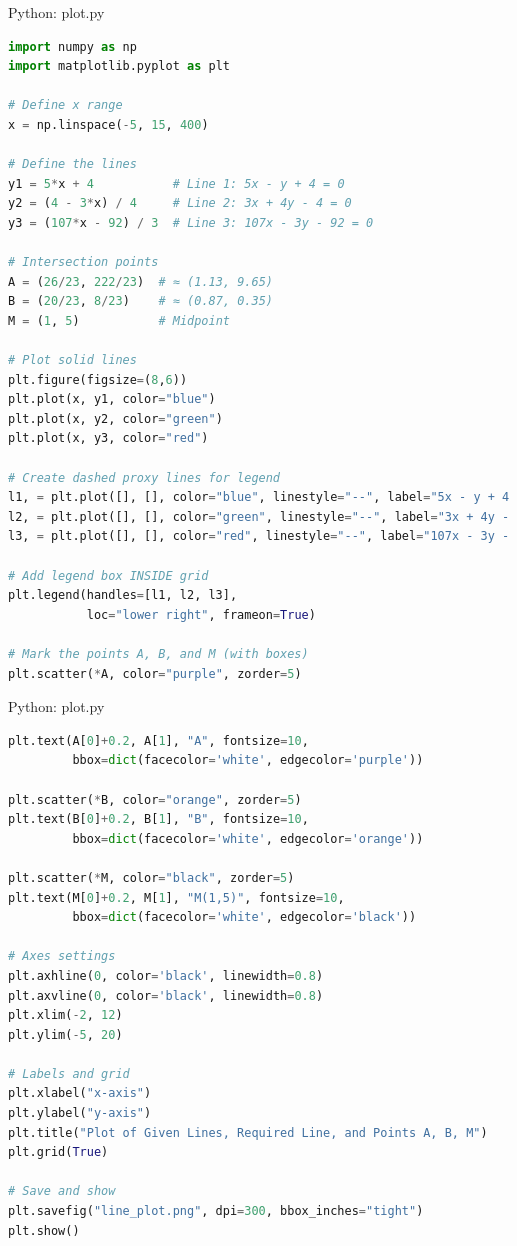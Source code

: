 \documentclass{beamer}
\numberwithin{equation}{section}
\theoremstyle{remark}
\begin{document}
\begin{frame}[fragile]{Python: plot.py}
\begin{lstlisting}[language=Python]
import numpy as np
import matplotlib.pyplot as plt

# Define x range
x = np.linspace(-5, 15, 400)

# Define the lines
y1 = 5*x + 4           # Line 1: 5x - y + 4 = 0
y2 = (4 - 3*x) / 4     # Line 2: 3x + 4y - 4 = 0
y3 = (107*x - 92) / 3  # Line 3: 107x - 3y - 92 = 0

# Intersection points
A = (26/23, 222/23)  # ≈ (1.13, 9.65)
B = (20/23, 8/23)    # ≈ (0.87, 0.35)
M = (1, 5)           # Midpoint

# Plot solid lines
plt.figure(figsize=(8,6))
plt.plot(x, y1, color="blue")
plt.plot(x, y2, color="green")
plt.plot(x, y3, color="red")

# Create dashed proxy lines for legend
l1, = plt.plot([], [], color="blue", linestyle="--", label="5x - y + 4 = 0")
l2, = plt.plot([], [], color="green", linestyle="--", label="3x + 4y - 4 = 0")
l3, = plt.plot([], [], color="red", linestyle="--", label="107x - 3y - 92 = 0")

# Add legend box INSIDE grid
plt.legend(handles=[l1, l2, l3],
           loc="lower right", frameon=True)

# Mark the points A, B, and M (with boxes)
plt.scatter(*A, color="purple", zorder=5)
\end{lstlisting}
\end{frame} 

\begin{frame}[fragile]{Python: plot.py}
\begin{lstlisting}[language=Python]
plt.text(A[0]+0.2, A[1], "A", fontsize=10,
         bbox=dict(facecolor='white', edgecolor='purple'))

plt.scatter(*B, color="orange", zorder=5)
plt.text(B[0]+0.2, B[1], "B", fontsize=10,
         bbox=dict(facecolor='white', edgecolor='orange'))

plt.scatter(*M, color="black", zorder=5)
plt.text(M[0]+0.2, M[1], "M(1,5)", fontsize=10,
         bbox=dict(facecolor='white', edgecolor='black'))

# Axes settings
plt.axhline(0, color='black', linewidth=0.8)
plt.axvline(0, color='black', linewidth=0.8)
plt.xlim(-2, 12)
plt.ylim(-5, 20)

# Labels and grid
plt.xlabel("x-axis")
plt.ylabel("y-axis")
plt.title("Plot of Given Lines, Required Line, and Points A, B, M")
plt.grid(True)

# Save and show
plt.savefig("line_plot.png", dpi=300, bbox_inches="tight")
plt.show()

\end{lstlisting}
\end{frame} 
\end{document}
